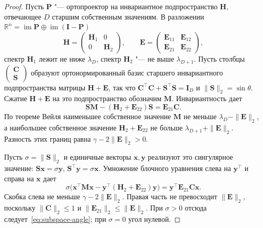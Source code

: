 \begin{proof}
    Пусть $\mathbf{P}$ "--- ортопроектор на инвариантное подпространство $\mathbf{H}$, отвечающее $D$ старшим собственным значениям. В разложении $\mathbb{R}^n=\operatorname{im}\mathbf{P}\oplus\operatorname{im}(\mathbf{I}-\mathbf{P})$
    \[
        \mathbf{H}
        =
        \begin{pmatrix}\mathbf{H}_1&0\\0&\mathbf{H}_2\end{pmatrix},
        \qquad
        \mathbf{E}
        =
        \begin{pmatrix}\mathbf{E}_{11}&\mathbf{E}_{12}\\\mathbf{E}_{21}&\mathbf{E}_{22}\end{pmatrix},
    \]
    спектр $\mathbf{H}_1$ лежит не ниже $\lambda_D$, спектр $\mathbf{H}_2$ "--- не выше $\lambda_{D+1}$. Пусть столбцы $\begin{pmatrix}\mathbf{C}\\\mathbf{S}\end{pmatrix}$ образуют ортонормированный базис старшего инвариантного подпространства матрицы $\mathbf{H}+\mathbf{E}$, так что $\mathbf{C}^\top\mathbf{C}+\mathbf{S}^\top\mathbf{S}=\mathbf{I}_D$ и $\|\mathbf{S}\|_2=\sin\theta$. Сжатие $\mathbf{H}+\mathbf{E}$ на это подпространство обозначим $\mathbf{M}$. Инвариантность дает
    \[
        \mathbf{S}\mathbf{M}-(\mathbf{H}_2+\mathbf{E}_{22})\mathbf{S}=\mathbf{E}_{21}\mathbf{C}.
    \]
    По теореме Вейля наименьшее собственное значение $\mathbf{M}$ не меньше $\lambda_D-\|\mathbf{E}\|_2$, а наибольшее собственное значение $\mathbf{H}_2+\mathbf{E}_{22}$ не больше $\lambda_{D+1}+\|\mathbf{E}\|_2$. Разность этих границ равна $\gamma-2\|\mathbf{E}\|_2>0$.

    Пусть $\sigma=\|\mathbf{S}\|_2$ и единичные векторы $\mathbf{x}, \mathbf{y}$ реализуют это сингулярное значение: $\mathbf{S}\mathbf{x}=\sigma\mathbf{y}$, $\mathbf{S}^\top\mathbf{y}=\sigma\mathbf{x}$. Умножение блочного уравнения слева на $\mathbf{y}^\top$ и справа на $\mathbf{x}$ дает
    \[
        \sigma\bigl(\mathbf{x}^\top\mathbf{M}\mathbf{x}-\mathbf{y}^\top(\mathbf{H}_2+\mathbf{E}_{22})\mathbf{y}\bigr)
        =
        \mathbf{y}^\top\mathbf{E}_{21}\mathbf{C}\mathbf{x}.
    \]
    Скобка слева не меньше $\gamma-2\|\mathbf{E}\|_2$. Правая часть не превосходит $\|\mathbf{E}\|_2$, поскольку $\|\mathbf{C}\|_2\leqslant 1$ и $\|\mathbf{E}_{21}\|_2\leqslant\|\mathbf{E}\|_2$. При $\sigma>0$ отсюда следует~\eqref{eq:subspace-angle}; при $\sigma=0$ угол нулевой.


\end{proof}
